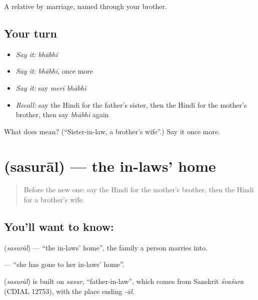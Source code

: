 \begin{grammarlens}[title={What you've built}]
A relative by marriage, named through your brother.
\end{grammarlens}

\subsection*{Your turn}
\begin{itemize}
\raggedright
  \item \emph{Say it:} \emph{bhābhī}
  \item \emph{Say it:} \emph{bhābhī}, once more
  \item \emph{Say it:} say \emph{merī bhābhī}
  \item \emph{Recall:} say the Hindi for the father's sister, then the Hindi for the mother's brother, then say \emph{bhābhī} again
\end{itemize}

\begin{tcolorbox}[breakable,colback=teal!4,colframe=teal!35!black,title={Before you move on}]
What does  mean? (\textquotedblleft{}Sister-in-law, a brother's wife\textquotedblright{}.) Say it once more.
\end{tcolorbox}
\section[\texorpdfstring{\hi{ससुराल} (sasurāl)}{ससुराल (sasurāl)}]{ (sasurāl) — the in-laws' home}

\label{lesson:HI-C117-sasural}



\begin{quote}
Before the new one: say the Hindi for the mother's brother, then the Hindi for a brother's wife.
\end{quote}

\subsection*{You'll want to know: }
\textbf{} (\emph{sasurāl}) — \textquotedblleft{}the in-laws' home\textquotedblright{}, the family a person marries into.

\textbf{   } — \textquotedblleft{}she has gone to her in-laws' home\textquotedblright{}.

\begin{cousinweb}
\textbf{} (\emph{sasurāl}) is built on \emph{sasur}, \textquotedblleft{}father-in-law\textquotedblright{}, which comes from Sanskrit \emph{śvaśura} (CDIAL 12753), with the place ending \emph{-āl}.
\end{cousinweb}

